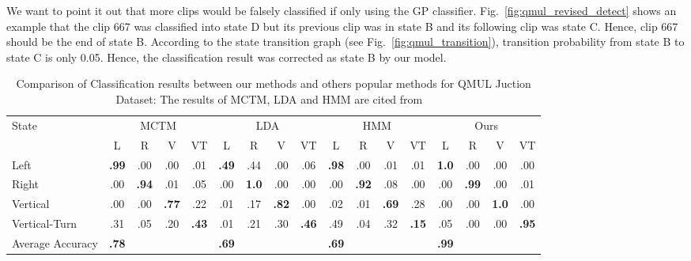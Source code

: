 We want to point it out that more clips would be falsely classified if only using the GP classifier. Fig.~\ref{fig:qmul_revised_detect} shows an example that the clip 667 was classified into state D but its previous clip was in state B and its following clip was state C. Hence, clip 667 should be the end of state B. According to the state transition graph (see Fig.~\ref{fig:qmul_transition}), transition probability from state B to state C is only 0.05. Hence, the classification result was corrected as state B by our model.

\begin{landscape}
	\begin{table}[!htbp]
		\begin{center}
			\renewcommand\arraystretch{1.5}
			\setlength{\tabcolsep}{7pt}
			\begin{tabular}{l | c c c c | c c c c | c c c c | c c c c}
				\toprule[1pt] 
				\multirow{2}{*}{State}		&\multicolumn{4}{c|}{MCTM}	&\multicolumn{4}{c|}{LDA}	&\multicolumn{4}{c|}{HMM}		&\multicolumn{4}{c}{Ours}\\
				\cmidrule{2-5}		\cmidrule{6-9}		\cmidrule{10-13}	\cmidrule{14-17}
				&L	&R	&V	&VT	&L	&R	&V	&VT	&L	&R	&V	&VT	&L	&R	&V	&VT\\
				\midrule[1pt]
				Left	&\textbf{.99}	&.00	&.00	&.01	&\textbf{.49}	&.44	&.00	&.06	&\textbf{.98}	&.00	&.01	&.01	
				
				&\textbf{1.0}	&.00	&.00	&.00\\
				
				Right	&.00	&\textbf{.94}	&.01	&.05	&.00	&\textbf{1.0}	&.00	&.00	&.00	&\textbf{.92}	&.08	&.00	
				
				&.00	&\textbf{.99}	&.00	&.01\\
				
				Vertical	&.00	&.00	&\textbf{.77}	&.22	&.01	&.17	&\textbf{.82}	&.00	&.02	&.01	&\textbf{.69}	&.28	
				
				&.00	&.00	&\textbf{1.0}	&.00\\
				
				Vertical-Turn	&.31	&.05	&.20	&\textbf{.43}	&.01	&.21	&.30	&\textbf{.46}	&.49	&.04	&.32	&\textbf{.15}	
				
				&.05	&.00	&.00	&\textbf{.95}\\
				\cmidrule{1-17}	
				Average Accuracy		&\textbf{.78}	&	&	&	&\textbf{.69}	&	&	&	&\textbf{.69}	&	&	&	
				
				&\textbf{.99}	&	&	&\\	%
				
				\bottomrule[1pt] 
				
			\end{tabular}
		\end{center}
		\caption[Comparison of Classification results between our methods and others popular methods for QMUL Juction Dataset]
		{Comparison of Classification results between our methods and others popular methods for QMUL Juction Dataset: The results of MCTM, LDA and HMM are cited from ~\cite{hospedales2012video}}
		\label{tab:qmul_compare} 
	\end{table}
\end{landscape}



